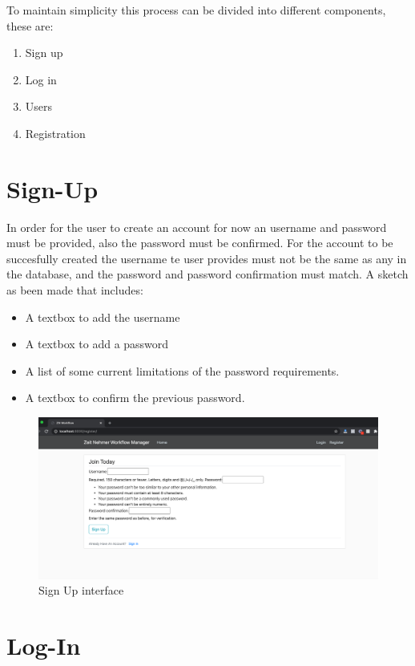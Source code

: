 \documentclass{article}[draft]
\begin{document}
\vspace{200}

To maintain simplicity this process can be divided into different components, these are:

\begin{enumerate}
  \item Sign up
  \item Log in
  \item Users
  \item Registration
\end{enumerate}


\section{Sign-Up}
  In order for the user to create an account for now an username and password must be provided, also the password must be confirmed. For the account to be succesfully created the username te user provides must not be the same as any in the database, and the password and password confirmation must match. A sketch as been made that includes:
  \begin{itemize}
    \item A textbox to add the username
    \item A textbox to add a password
    \item A list of some current limitations of the password requirements.
    \item A textbox to confirm the previous password.
  \end{itemize}

  \begin{figure}[h!]
      \centering
      \includegraphics[scale=0.75]{Images/signupMock}
      \caption{Sign Up interface}
      \label{fig:figure 2}
  \end{figure}

\section{Log-In}
\end{document}
